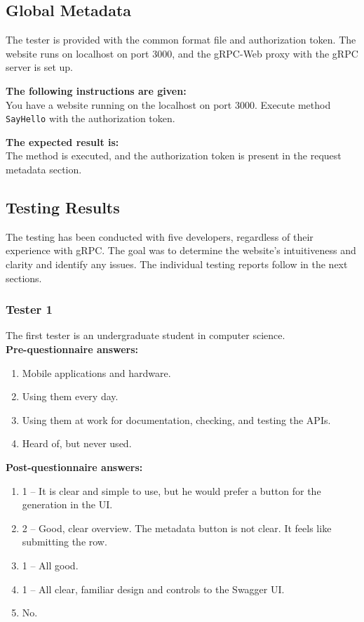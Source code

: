 \subsection{Global Metadata}
The tester is provided with the common format file and authorization token.
The website runs on localhost on port 3000, and the gRPC-Web proxy with the gRPC server is set up.

\textbf{The following instructions are given:}\\
You have a website running on the localhost on port 3000.
Execute method \texttt{SayHello} with the authorization token.

\textbf{The expected result is:}\\
The method is executed, and the authorization token is present in the request metadata section.

\subsection{Testing Results}
The testing has been conducted with five developers, regardless of their experience with gRPC\@.
The goal was to determine the website's intuitiveness and clarity and identify any issues.
The individual testing reports follow in the next sections.

\subsubsection{Tester 1}
The first tester is an undergraduate student in computer science.\\

\textbf{Pre-questionnaire answers:}
\begin{enumerate}
    \item Mobile applications and hardware.
    \item Using them every day.
    \item Using them at work for documentation, checking, and testing the APIs.
    \item Heard of, but never used.
\end{enumerate}

\textbf{Post-questionnaire answers:}
\begin{enumerate}
    \item 1 -- It is clear and simple to use, but he would prefer a button for the generation in the UI\@.
    \item 2 -- Good, clear overview.
    The metadata button is not clear.
    It feels like submitting the row.
    \item 1 -- All good.
    \item 1 -- All clear, familiar design and controls to the Swagger UI\@.
    \item No.
\end{enumerate}

